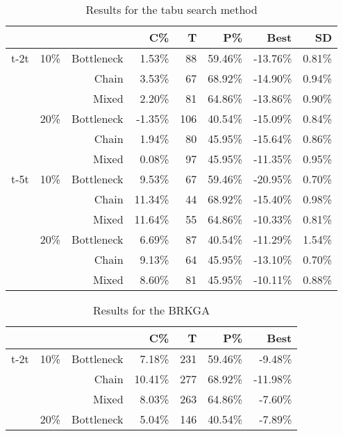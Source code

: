 \documentclass{singlecol-new}
\begin{document}
\begin{table}[!htbp]
  \centering
  \caption{Results for the tabu search method}
    \begin{tabular}{|r|r|r|r|r|r|r|r|}
\hline
          &       &       & C\%   & T     & P\%   & Best  & SD \\
\hline
    t-2t  & 10\%  & Bottleneck & 1.53\% & 88    & 59.46\% & -13.76\% & 0.81\% \\
          &       & Chain & 3.53\% & 67    & 68.92\% & -14.90\% & 0.94\% \\
          &       & Mixed & 2.20\% & 81    & 64.86\% & -13.86\% & 0.90\% \\
          & 20\%  & Bottleneck & -1.35\% & 106   & 40.54\% & -15.09\% & 0.84\% \\
          &       & Chain & 1.94\% & 80    & 45.95\% & -15.64\% & 0.86\% \\
          &       & Mixed & 0.08\% & 97    & 45.95\% & -11.35\% & 0.95\% \\
\hline
    t-5t  & 10\%  & Bottleneck & 9.53\% & 67    & 59.46\% & -20.95\% & 0.70\% \\
          &       & Chain & 11.34\% & 44    & 68.92\% & -15.40\% & 0.98\% \\
          &       & Mixed & 11.64\% & 55    & 64.86\% & -10.33\% & 0.81\% \\
          & 20\%  & Bottleneck & 6.69\% & 87    & 40.54\% & -11.29\% & 1.54\% \\
          &       & Chain & 9.13\% & 64    & 45.95\% & -13.10\% & 0.70\% \\
          &       & Mixed & 8.60\% & 81    & 45.95\% & -10.11\% & 0.88\% \\
\hline
    \end{tabular}\label{tab:results_tabu}\end{table}\begin{table}[!htbp]
  \centering
  \caption{Results for the BRKGA}
    \begin{tabular}{|r|r|r|r|r|r|r|}
\hline
          &       &       & C\%   & T     & P\%   & Best \\
\hline
    t-2t  & 10\%  & Bottleneck & 7.18\% & 231   & 59.46\% & -9.48\%  \\
          &       & Chain & 10.41\% & 277   & 68.92\% & -11.98\% \\
          &       & Mixed & 8.03\% & 263   & 64.86\% & -7.60\% \\
          & 20\%  & Bottleneck & 5.04\% & 146   & 40.54\% & -7.89\%  \\

\end{tabular}
\end{table}
\end{document}
